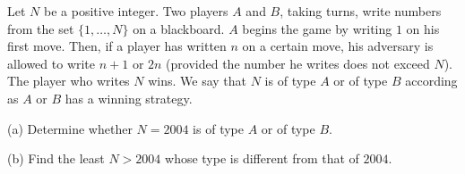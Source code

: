Let $N$ be a positive integer. Two players $A$ and $B$, taking turns, write numbers from the set $\{1, \ldots, N\}$ on a blackboard. $A$ begins the game by writing $1$ on his first move. Then, if a player has written $n$ on a certain move, his adversary is allowed to write $n+1$ or $2n$ (provided the number he writes does not exceed $N$). The player who writes $N$ wins. We say that $N$ is of type $A$ or of type $B$ according as $A$ or $B$ has a winning strategy.

(a) Determine whether $N = 2004$ is of type $A$ or of type $B$.

(b) Find the least $N > 2004$ whose type is different from that of $2004$.
